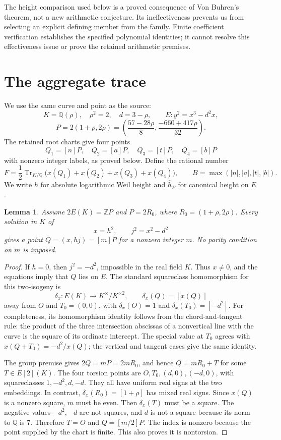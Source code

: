 \documentclass[11pt,a4paper]{article}
\newtheorem{lemma}[theorem]{Lemma}
\theoremstyle{remark}\newtheorem{remark}[theorem]{Remark}
\newcommand{\Q}{\mathbb Q}\newcommand{\Z}{\mathbb Z}
\DeclareMathOperator{\Tr}{Tr}
\begin{document}
The height comparison used below is a proved consequence of
Von Buhren's theorem, not a new arithmetic conjecture. Its
ineffectiveness prevents us from selecting an explicit defining
member from the family. Finite coefficient verification establishes
the specified polynomial identities; it cannot resolve this
effectiveness issue or prove the retained arithmetic premises.

\section{The aggregate trace}
We use the same curve and point as the source:
\[
 K=\Q(\rho),\quad \rho^2=2,\quad d=3-\rho,\qquad
 E:y^2=x^3-d^2x,
\]
\[
 P=2(1+\rho,2\rho)
   =\left(\frac{57-28\rho}{8},\frac{-660+417\rho}{32}\right).
\]
The retained root charts give four points
\[
 Q_1=[n]P,\quad Q_2=[a]P,\quad Q_3=[t]P,\quad Q_4=[b]P
\]
with nonzero integer labels, as proved below. Define the rational number
\[
 F=\frac12\Tr_{K/\Q}\bigl(x(Q_1)+x(Q_2)+x(Q_3)+x(Q_4)\bigr),
 \qquad B=\max(|n|,|a|,|t|,|b|).
\]
We write $h$ for absolute logarithmic Weil height and $\widehat h_E$
for canonical height on $E$.

\begin{lemma}\label{lem:square-chart}
Assume $2E(K)=\Z P$ and $P=2R_0$, where
$R_0=(1+\rho,2\rho)$. Every solution in $K$ of
\[
 x=h^2,\qquad j^2=x^2-d^2
\]
gives a point $Q=(x,hj)=[m]P$ for a nonzero integer $m$.
No parity condition on $m$ is imposed.
\end{lemma}
\begin{proof}
If $h=0$, then $j^2=-d^2$, impossible in the real field $K$.
Thus $x\ne0$, and the equations imply that $Q$ lies on $E$.
The standard squareclass homomorphism for this two-isogeny is
\[
 \delta_x:E(K)\longrightarrow K^\times/K^{\times2},\qquad
 \delta_x(Q)=[x(Q)]
\]
away from $O$ and $T_0=(0,0)$, with
$\delta_x(O)=1$ and $\delta_x(T_0)=[-d^2]$.
For completeness, its homomorphism identity follows from the
chord-and-tangent rule: the product of the three intersection
abscissas of a nonvertical line with the curve is the square of
its ordinate intercept. The special value at $T_0$ agrees with
$x(Q+T_0)=-d^2/x(Q)$; the vertical and tangent cases give the
same identity.

The group premise gives $2Q=mP=2mR_0$, and hence
$Q=mR_0+T$ for some $T\in E[2](K)$. The four torsion points
are $O,T_0,(d,0),(-d,0)$, with squareclasses
$1,-d^2,d,-d$. They all have uniform real signs at the two
embeddings. In contrast, $\delta_x(R_0)=[1+\rho]$ has mixed
real signs. Since $x(Q)$ is a nonzero square, $m$ must be even.
Then $\delta_x(T)$ must be a square. The negative values
$-d^2,-d$ are not squares, and $d$ is not a square because its
norm to $\Q$ is $7$. Therefore $T=O$ and $Q=[m/2]P$.
The index is nonzero because the point supplied by the chart is
finite. This also proves it is nontorsion.
\end{proof}
\end{document}

